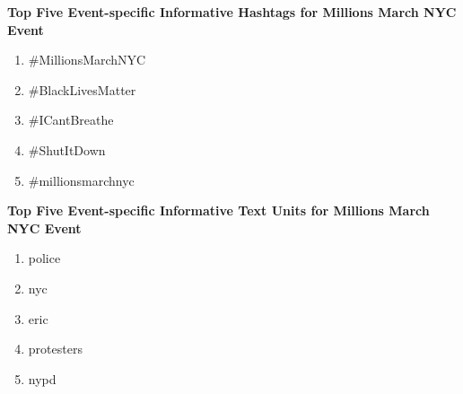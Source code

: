 \textbf{Top Five Event-specific Informative Hashtags for Millions March NYC Event}
\begin{enumerate}
\item \#MillionsMarchNYC
\item \#BlackLivesMatter
\item \#ICantBreathe
\item \#ShutItDown
\item \#millionsmarchnyc                                                                                                                                                                                                                                                                                                                                                                                                                                                                                                                 
\end{enumerate}

\textbf{Top Five Event-specific Informative Text Units for Millions March NYC Event}
\begin{enumerate}
\item police
\item nyc
\item eric
\item protesters
\item nypd                                                                                                                                                                                                                                                                                                                                                                                                                                                                                                                
\end{enumerate}

